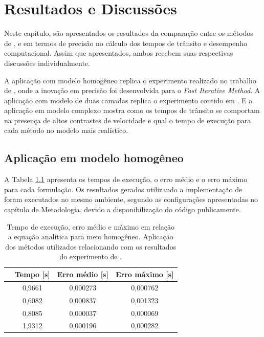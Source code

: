 \chapter{Resultados e Discussões}
\label{ch:resultados}

Neste capítulo, são apresentados os resultados da comparação entre os métodos de ,  e  em termos de precisão no cálculo dos tempos de trânsito e desempenho computacional. Assim que apresentados, ambos recebem suas respectivas discussões individualmente.

A aplicação com modelo homogêneo replica o experimento realizado no trabalho de , onde a inovação em precisão foi desenvolvida para o \textit{Fast Iterative Method}. A aplicação com modelo de duas camadas replica o experimento contido em . E a aplicação em modelo complexo mostra como os tempos de trânsito se comportam na presença de altos contrastes de velocidade e qual o tempo de execução para cada método no modelo mais realístico.    

\section{Aplicação em modelo homogêneo}

A Tabela \ref{table_homog} apresenta os tempos de execução, o erro médio e o erro máximo para cada formulação. Os resultados gerados utilizando a implementação de  foram executados no mesmo ambiente, segundo as configurações apresentadas no capítulo de Metodologia, devido a disponibilização do código publicamente.  

\begin{table}[H]
	\caption{Tempo de execução, erro médio e máximo em relação a equação analítica para meio homogêneo. Aplicação dos métodos utilizados relacionando com os resultados do experimento de .}
	\begin{tabular}{r|ccc}
		\multicolumn{1}{c|}{} & Tempo {[}s{]} & Erro médio {[}s{]} & Erro máximo {[}s{]} \\ \hline
		\citeonline{podvin1991finite} & 0,9661        & 0,000273           & 0,000762            \\ \hline
		\citeonline{jeong2008fast}    & 0,6082        & 0,000837           & 0,001323            \\ \hline
		\citeonline{noble2014accurate}& 0,8085        & 0,000037           & 0,000069            \\ \hline
		\citeonline{cai2023improved}  & 1,9312        & 0,000196           & 0,000282           
	\end{tabular}
	\label{table_homog}
\end{table}

